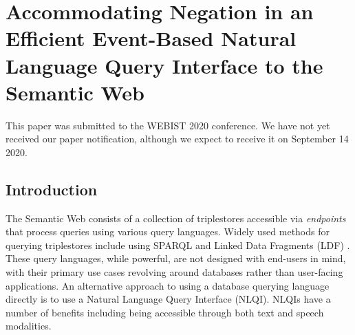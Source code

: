 \documentclass[../main.tex]{subfiles}
\begin{document}
\chapter{Accommodating Negation in an Efficient Event-Based Natural Language Query Interface to the Semantic Web}

\begin{refsection}

\label{chapter:webist2020conf}

This paper was submitted to the WEBIST 2020 conference.  We have not yet received our paper notification,
although we expect to receive it on September 14 2020. %

\section{Introduction}
\label{sec:introduction}


\noindent The Semantic Web consists of a collection of triplestores accessible via \textit{endpoints} that process queries using various query languages.  Widely used methods for querying triplestores include using SPARQL \cite{sparql} and Linked Data Fragments (LDF) \cite{verborgh2014web}.  These query languages, while powerful, are not designed with end-users in mind, with their primary use cases revolving around databases rather than user-facing applications.
An alternative approach to using a database querying language directly is to use a Natural Language Query Interface (NLQI).  NLQIs have a number of benefits including being accessible through both text and speech modalities.


\end{refsection}
\end{document}
